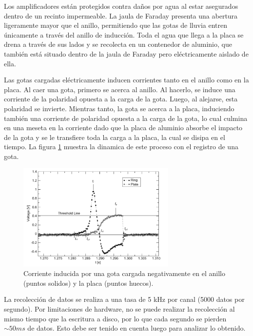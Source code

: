 \documentclass[12pt,a4paper]{article}
\begin{document}
Los amplificadores están protegidos contra daños por agua al estar asegurados dentro de un recinto impermeable. La jaula de Faraday presenta una abertura ligeramente mayor que el anillo, permitiendo que las gotas de lluvia entren únicamente a través del anillo de inducción. Toda el agua que llega a la placa se drena a través de sus lados y se recolecta en un contenedor de aluminio, que también está situado dentro de la jaula de Faraday pero eléctricamente aislado de ella.

Las gotas cargadas eléctricamente inducen corrientes tanto en el anillo como en la placa. Al caer una gota, primero se acerca al anillo. Al hacerlo, se induce una corriente de la polaridad opuesta a la carga de la gota. Luego, al alejarse, esta polaridad se invierte. Mientras tanto, la gota se acerca a la placa, induciendo también una corriente de polaridad opuesta a la carga de la gota, lo cual culmina en una meseta en la corriente dado que la placa de aluminio absorbe el impacto de la gota y se le transfiere toda la carga a la placa, la cual se disipa en el tiempo. La figura \ref{fig:corriente_gotas} muestra la dinamica de este proceso con el registro de una gota.

\begin{figure}[!hb]
    \centering
    \includegraphics[width=0.7\textwidth]{figures/corriente_gotas.png}
    \caption{Corriente inducida por una gota cargada negativamente en el anillo (puntos solidos) y la placa (puntos huecos).}
    \label{fig:corriente_gotas}
\end{figure}

La recolección de datos se realiza a una tasa de 5 kHz por canal (5000 datos por segundo). Por limitaciones de hardware, no se puede realizar la recolección al mismo tiempo que la escritura a disco, por lo que cada segundo se pierden $\sim 50ms$ de datos. Esto debe ser tenido en cuenta luego para analizar lo obtenido.
\end{document}
